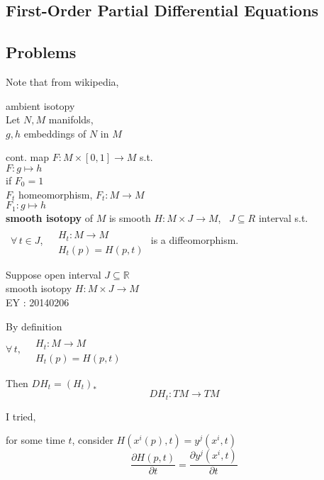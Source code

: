 \subsection*{First-Order Partial Differential Equations }



\subsection*{ Problems }


 Note that from wikipedia, 

ambient isotopy \\
Let $N, M$ manifolds, \\
\quad $g,h$ embeddings of $N$ in $M$ 

cont. map $F: M \times [0,1] \to M$ s.t.  \\
$F: g\mapsto h$ \\
if $F_0 = 1$ \\
\phantom{ if } $F_t$ homeomorphism, $F_t: M \to M$ \\
\phantom{ if } $F_1 : g \mapsto h$ \\

\textbf{smooth isotopy} of $M$ is smooth $H: M \times J \to M$, \, $J \subseteq R$ interval s.t. \\
\quad \, $\forall \, t \in J$, $\begin{aligned} & \quad \\
  & H_t : M \to M \\
  & H_t(p) = H(p,t) \end{aligned}$ is a diffeomorphism.  

Suppose open interval $J \subseteq \mathbb{R}$ \\
\phantom{Suppose } smooth isotopy $H:M \times J \to M$ \\

EY : 20140206 

By definition \\
$\forall \, t, \, \begin{aligned} & \quad \\
  & H_t : M \to M \\
  & H_t(p) = H(p,t) \end{aligned}$

Then $DH_t = (H_t)_*$ \\
\[
DH_t : TM \to TM
\]

I tried, 

for some time $t$, consider $H(x^i(p),t) = y^j(x^i,t)$ 
\[
\frac{ \partial H(p,t)}{ \partial t } = \frac{ \partial y^j(x^i,t) }{ \partial t }
\]

